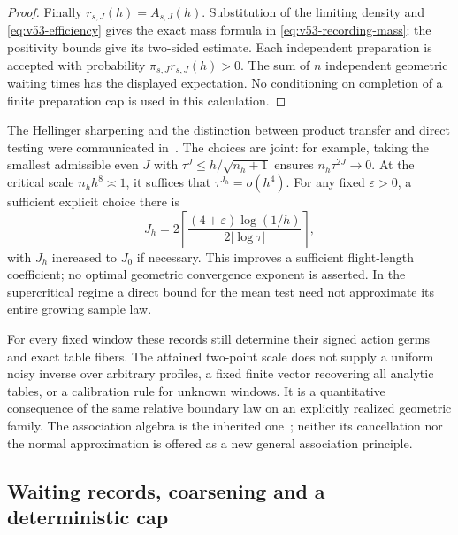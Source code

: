 \begin{proof}
Finally $r_{s,J}(h)=A_{s,J}(h)$.  Substitution of the limiting density
and \eqref{eq:v53-efficiency} gives the exact mass formula in
\eqref{eq:v53-recording-mass}; the positivity bounds give its two-sided
estimate.  Each independent preparation is accepted with probability
$\pi_{s,J}r_{s,J}(h)>0$.  The sum of $n$ independent geometric waiting
times has the displayed expectation.  No conditioning on completion
of a finite preparation cap is used in this calculation.
\end{proof}

The Hellinger sharpening and the distinction between product transfer and
direct testing were communicated in~\cite{A2ReviewV53}.  The choices are
joint: for example, taking the smallest admissible even $J$ with
$\tau^J\le h/\sqrt{n_h+1}$ ensures $n_h\tau^{2J}\to0$.  At the critical
scale $n_hh^8\asymp1$, it suffices that $\tau^{J_h}=o(h^4)$.
For any fixed $\varepsilon>0$, a sufficient explicit choice there is
\[
 J_h=2\left\lceil
       \frac{(4+\varepsilon)\log(1/h)}{2|\log\tau|}
      \right\rceil,
\]
with $J_h$ increased to $J_0$ if necessary.  This improves a sufficient
flight-length coefficient; no optimal geometric convergence exponent is
asserted.  In the supercritical regime a direct bound for the mean test
need not approximate its entire growing sample law.

For every fixed window these records still determine their signed action
germs and exact table fibers.  The attained two-point scale does not
supply a uniform noisy inverse over arbitrary profiles, a fixed finite
vector recovering all analytic tables, or a calibration rule for unknown
windows.  It is a quantitative consequence of the same relative boundary
law on an explicitly realized geometric family.  The association algebra
is the inherited one~\cite{Osius2009}; neither its cancellation nor the
normal approximation is offered as a new general association principle.

\subsection{Waiting records, coarsening and a deterministic cap}

